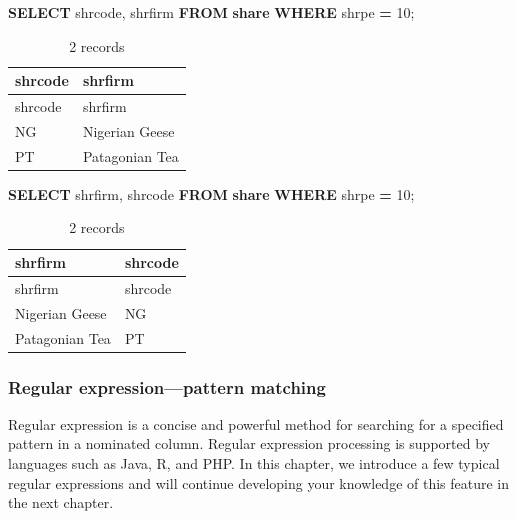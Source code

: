 \documentclass[
]{article}
\newenvironment{Shaded}{\begin{snugshade}}{\end{snugshade}}
\newcommand{\DecValTok}[1]{\textcolor[rgb]{0.00,0.00,0.81}{#1}}
\newcommand{\KeywordTok}[1]{\textcolor[rgb]{0.13,0.29,0.53}{\textbf{#1}}}
\newcommand{\NormalTok}[1]{#1}
\newcommand{\OperatorTok}[1]{\textcolor[rgb]{0.81,0.36,0.00}{\textbf{#1}}}
\begin{document}
\begin{Shaded}
\begin{Highlighting}[]
\KeywordTok{SELECT}\NormalTok{ shrcode, shrfirm }\KeywordTok{FROM} \KeywordTok{share} \KeywordTok{WHERE}\NormalTok{ shrpe }\OperatorTok{=} \DecValTok{10}\NormalTok{;}
\end{Highlighting}
\end{Shaded}

\begin{longtable}[]{@{}ll@{}}
\caption{2 records}\tabularnewline
\toprule()
shrcode & shrfirm \\
\midrule()
\endfirsthead
\toprule()
shrcode & shrfirm \\
\midrule()
\endhead
NG & Nigerian Geese \\
PT & Patagonian Tea \\
\bottomrule()
\end{longtable}

\begin{Shaded}
\begin{Highlighting}[]
\KeywordTok{SELECT}\NormalTok{ shrfirm, shrcode }\KeywordTok{FROM} \KeywordTok{share} \KeywordTok{WHERE}\NormalTok{ shrpe }\OperatorTok{=} \DecValTok{10}\NormalTok{;}
\end{Highlighting}
\end{Shaded}

\begin{longtable}[]{@{}ll@{}}
\caption{2 records}\tabularnewline
\toprule()
shrfirm & shrcode \\
\midrule()
\endfirsthead
\toprule()
shrfirm & shrcode \\
\midrule()
\endhead
Nigerian Geese & NG \\
Patagonian Tea & PT \\
\bottomrule()
\end{longtable}

\hypertarget{regular-expressionpattern-matching}{%
\subsubsection{Regular expression---pattern
matching}\label{regular-expressionpattern-matching}}

Regular expression is a concise and powerful method for searching for a
specified pattern in a nominated column. Regular expression processing
is supported by languages such as Java, R, and PHP. In this chapter, we
introduce a few typical regular expressions and will continue developing
your knowledge of this feature in the next chapter.
\end{document}
